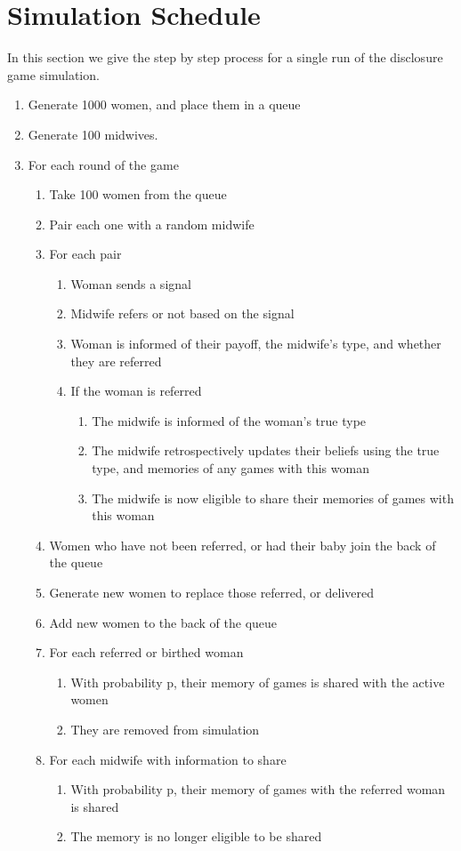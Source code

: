 
\section{Simulation Schedule}
\label{app:sim_schedule}

In this section we give the step by step process for a single run of the disclosure game simulation.

\begin{enumerate}
\item Generate 1000 women, and place them in a queue
\item Generate 100 midwives.
\item For each round of the game
\begin{enumerate}
	\item Take 100 women from the queue
	\item Pair each one with a random midwife
	\item For each pair
	\begin{enumerate}
		\item Woman sends a signal
		\item Midwife refers or not based on the signal
		\item Woman is informed of their payoff, the midwife's type, and whether they are referred
		\item If the woman is referred
		\begin{enumerate}
			\item The midwife is informed of the woman's true type
			\item The midwife retrospectively updates their beliefs using the true type, and memories of any games with this woman
			\item The midwife is now eligible to share their memories of games with this woman
		\end{enumerate}
	\end{enumerate}
	\item Women who have not been referred, or had their baby join the back of the queue
	\item Generate new women to replace those referred, or delivered
	\item Add new women to the back of the queue
	\item For each referred or birthed woman
	\begin{enumerate}
		\item With probability p, their memory of games is shared with the active women
		\item They are removed from simulation
	\end{enumerate}
	\item For each midwife with information to share
	\begin{enumerate}
		\item With probability p, their memory of games with the referred woman is shared
		\item The memory is no longer eligible to be shared
	\end{enumerate}
\end{enumerate}
\end{enumerate}
